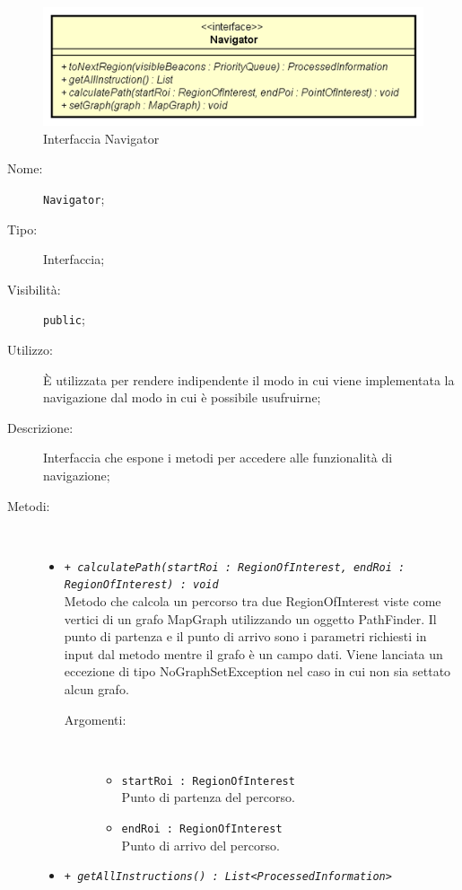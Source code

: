 \documentclass[../DefinizioneDiProdotto.tex]{subfiles}
\begin{document}
    \begin{figure}[H]
        \centering
        \includegraphics{img/Navigator.png}
        \caption{Interfaccia Navigator}\label{fig:model::navigator::Navigator} 
    \end{figure}
    \begin{description}
\item[Nome:] \texttt{Navigator};
\item[Tipo:] Interfaccia;
\item[Visibilità:] \texttt{public};
\item[Utilizzo:] È utilizzata per rendere indipendente il modo in cui viene implementata la navigazione dal modo in cui è possibile usufruirne;
\item[Descrizione:] Interfaccia che espone i metodi per accedere alle funzionalità di navigazione;
\item[Metodi:] \
\begin{itemize}
\item \texttt{+ \textit{calculatePath(startRoi : RegionOfInterest, endRoi : RegionOfInterest) : void}}\\
Metodo che calcola un percorso tra due RegionOfInterest viste come vertici di un grafo MapGraph utilizzando un oggetto PathFinder. Il punto di partenza e il punto di arrivo sono i parametri richiesti in input dal metodo mentre il grafo è un campo dati. Viene lanciata un eccezione di tipo NoGraphSetException nel caso in cui non sia settato alcun grafo.
 \begin{description}
\item[Argomenti:] \
\begin{itemize}
\item \texttt{startRoi : RegionOfInterest}\\
Punto di partenza del percorso.\item \texttt{endRoi : RegionOfInterest}\\
Punto di arrivo del percorso.\end{itemize}
\end{description}
\item \texttt{+ \textit{getAllInstructions() : List<ProcessedInformation>}}\\

\end{itemize}
\end{description}
\end{document}

